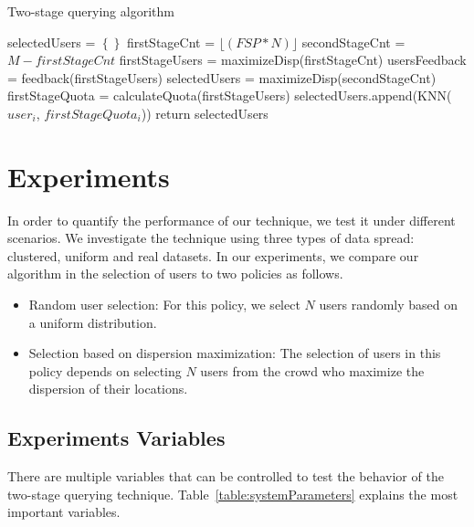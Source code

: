 \documentclass{acm_proc_article-sp}
\newcommand\floor[1]{\lfloor#1\rfloor}
\begin{document}
\begin{algorithm}
\caption{Two-stage querying algorithm}
\label{TSalgorithm}
   \begin{algorithmic}[1]
           \State selectedUsers = $\left\{\right\}$
           \State firstStageCnt = $\floor{(FSP*N)}$
           \State secondStageCnt = $M - firstStageCnt$
           \State firstStageUsers = maximizeDisp(firstStageCnt)
           \State usersFeedback = feedback(firstStageUsers)
                  \State selectedUsers = maximizeDisp(secondStageCnt){}
           \Else
           \EndIf   
         \State firstStageQuota = calculateQuota(firstStageUsers)
       \State selectedUsers.append(KNN($user_i$, $firstStageQuota_i$))
     \EndFor
\State return {selectedUsers}
\EndFunction
\end{algorithmic}
\end{algorithm}

\section{Experiments}
In order to quantify the performance of our technique, we test it under different scenarios. We investigate the technique using three types of data spread: clustered, uniform and real datasets. In our experiments, we compare our algorithm in the selection of users to two policies as follows.
\begin{itemize}
\item Random user selection: For this policy, we select $N$ users randomly based on a uniform distribution.
\item Selection based on dispersion maximization: The selection of users in this policy depends on selecting $N$ users from the crowd who maximize the dispersion of their locations.
\end{itemize}
\subsection{Experiments Variables}
There are multiple variables that can be controlled to test the behavior of the two-stage querying technique. Table~\ref{table:systemParameters} explains the most important variables.
\end{document}
